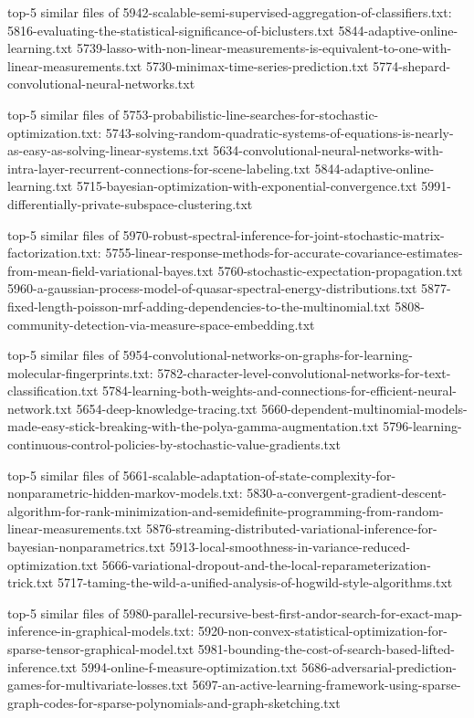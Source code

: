 \documentclass[11pt]{article}
\begin{document}
top-5 similar files of
5942-scalable-semi-supervised-aggregation-of-classifiers.txt:
5816-evaluating-the-statistical-significance-of-biclusters.txt
5844-adaptive-online-learning.txt
5739-lasso-with-non-linear-measurements-is-equivalent-to-one-with-linear-measurements.txt
5730-minimax-time-series-prediction.txt
5774-shepard-convolutional-neural-networks.txt

top-5 similar files of
5753-probabilistic-line-searches-for-stochastic-optimization.txt:
5743-solving-random-quadratic-systems-of-equations-is-nearly-as-easy-as-solving-linear-systems.txt
5634-convolutional-neural-networks-with-intra-layer-recurrent-connections-for-scene-labeling.txt
5844-adaptive-online-learning.txt
5715-bayesian-optimization-with-exponential-convergence.txt
5991-differentially-private-subspace-clustering.txt

top-5 similar files of
5970-robust-spectral-inference-for-joint-stochastic-matrix-factorization.txt:
5755-linear-response-methods-for-accurate-covariance-estimates-from-mean-field-variational-bayes.txt
5760-stochastic-expectation-propagation.txt
5960-a-gaussian-process-model-of-quasar-spectral-energy-distributions.txt
5877-fixed-length-poisson-mrf-adding-dependencies-to-the-multinomial.txt
5808-community-detection-via-measure-space-embedding.txt

top-5 similar files of
5954-convolutional-networks-on-graphs-for-learning-molecular-fingerprints.txt:
5782-character-level-convolutional-networks-for-text-classification.txt
5784-learning-both-weights-and-connections-for-efficient-neural-network.txt
5654-deep-knowledge-tracing.txt
5660-dependent-multinomial-models-made-easy-stick-breaking-with-the-polya-gamma-augmentation.txt
5796-learning-continuous-control-policies-by-stochastic-value-gradients.txt

top-5 similar files of
5661-scalable-adaptation-of-state-complexity-for-nonparametric-hidden-markov-models.txt:
5830-a-convergent-gradient-descent-algorithm-for-rank-minimization-and-semidefinite-programming-from-random-linear-measurements.txt
5876-streaming-distributed-variational-inference-for-bayesian-nonparametrics.txt
5913-local-smoothness-in-variance-reduced-optimization.txt
5666-variational-dropout-and-the-local-reparameterization-trick.txt
5717-taming-the-wild-a-unified-analysis-of-hogwild-style-algorithms.txt

top-5 similar files of
5980-parallel-recursive-best-first-andor-search-for-exact-map-inference-in-graphical-models.txt:
5920-non-convex-statistical-optimization-for-sparse-tensor-graphical-model.txt
5981-bounding-the-cost-of-search-based-lifted-inference.txt
5994-online-f-measure-optimization.txt
5686-adversarial-prediction-games-for-multivariate-losses.txt
5697-an-active-learning-framework-using-sparse-graph-codes-for-sparse-polynomials-and-graph-sketching.txt
\end{document}
